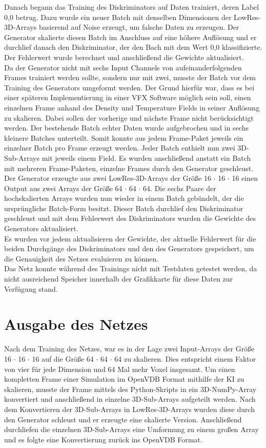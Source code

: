 Danach begann das Training des Diskriminators auf Daten trainiert, deren Label 0,0 betrug. Dazu wurde ein neuer Batch mit denselben Dimensionen der LowRes-3D-Arrays basierend auf Noise erzeugt, um falsche Daten zu erzeugen. Der Generator skalierte diesen Batch im Anschluss auf eine höhere Auflösung und er durchlief danach den Diskriminator, der den Bach mit dem Wert 0,0 klassifizierte. Der Fehlerwert wurde berechnet und anschließend die Gewichte aktualisiert.\\

Da der Generator nicht mit sechs Input Channels von aufeinanderfolgenden Frames trainiert werden sollte, sondern nur mit zwei, musste der Batch vor dem Training des Generators umgeformt werden. Der Grund hierfür war, dass es bei einer späteren Implementierung in einer VFX Software möglich sein soll, einen einzelnen Frame anhand des Density und Temperature Fields in seiner Auflösung zu skalieren. Dabei sollen der vorherige und nächste Frame nicht berücksichtigt werden. Der bestehende Batch echter Daten wurde aufgebrochen und in sechs kleinere Batches unterteilt. Somit konnte aus jedem Frame-Paket jeweils ein einzelner Batch pro Frame erzeugt werden. Jeder Batch enthielt nun zwei 3D-Sub-Arrays mit jeweils einem Field. Es wurden anschließend anstatt ein Batch mit mehreren Frame-Paketen, einzelne Frames durch den Generator geschleust. Der Generator erzeugte aus zwei LowRes-3D-Arrays der Größe 16 $\cdot$ 16 $\cdot$ 16 einen Output aus zwei Arrays der Größe 64 $\cdot$ 64 $\cdot$ 64. Die sechs Paare der hochskalierten Arrays wurden nun wieder in einem Batch gebündelt, der die ursprüngliche Batch-Form besitzt. Dieser Batch durchlief den Diskriminator geschleust und mit dem Fehlerwert des Diskriminators wurden die Gewichte des Generators aktualisiert. \\

Es wurden vor jedem aktualisieren der Gewichte, der aktuelle Fehlerwert für die beiden Durchgänge des Diskriminators und den des Generators gespeichert, um die Genauigkeit des Netzes evaluieren zu können.\\

Das Netz konnte während des Trainings nicht mit Testdaten getestet werden, da nicht ausreichend Speicher innerhalb der Grafikkarte für diese Daten zur Verfügung stand.\\

\section{Ausgabe des Netzes}
Nach dem Training des Netzes, war es in der Lage zwei Input-Arrays der Größe 16 $\cdot$ 16 $\cdot$ 16 auf die Größe 64 $\cdot$ 64 $\cdot$ 64 zu skalieren. Dies entspricht einem Faktor von vier für jede Dimension und 64 Mal mehr Voxel insgesamt. Um einen kompletten Frame einer Simulation im OpenVDB Format mithilfe der KI zu skalieren, musste der Frame mittels des Python-Skripts in ein 3D-NumPy-Array konvertiert und anschließend in einzelne 3D-Sub-Arrays aufgeteilt werden. Nach dem Konvertieren der 3D-Sub-Arrays in LowRes-3D-Arrays wurden diese durch den Generator schleust und er erzeugte eine skalierte Version. Anschließend durchliefen die einzelnen 3D-Sub-Arrays eine Umformung zu einem großen Array und es folgte eine Konvertierung zurück ins OpenVDB Format. 